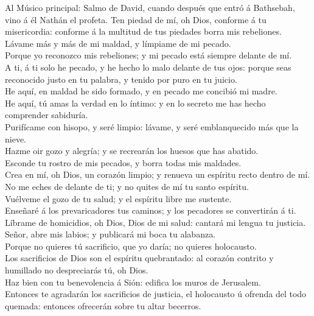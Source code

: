  Al Músico principal: Salmo de David, cuando después que
entró á Bathsebah, vino á él Nathán el profeta. Ten piedad de mí, oh
Dios, conforme á tu misericordia: conforme á la multitud de tus piedades
borra mis rebeliones.\\
 Lávame más y más de mi maldad, y límpiame de mi pecado.\\
 Porque yo reconozco mis rebeliones; y mi pecado está
siempre delante de mí.\\
 A ti, á ti solo he pecado, y he hecho lo malo delante de
tus ojos: porque seas reconocido justo en tu palabra, y tenido por puro
en tu juicio.\\
 He aquí, en maldad he sido formado, y en pecado me
concibió mi madre.\\
 He aquí, tú amas la verdad en lo íntimo: y en lo secreto
me has hecho comprender sabiduría.\\
 Purifícame con hisopo, y seré limpio: lávame, y seré
emblanquecido más que la nieve.\\
 Hazme oir gozo y alegría; y se recrearán los huesos que
has abatido.\\
 Esconde tu rostro de mis pecados, y borra todas mis
maldades.\\
 Crea en mí, oh Dios, un corazón limpio; y renueva un
espíritu recto dentro de mí.\\
 No me eches de delante de ti; y no quites de mí tu santo
espíritu.\\
 Vuélveme el gozo de tu salud; y el espíritu libre me
sustente.\\
 Enseñaré á los prevaricadores tus caminos; y los
pecadores se convertirán á ti.\\
 Líbrame de homicidios, oh Dios, Dios de mi salud:
cantará mi lengua tu justicia.\\
 Señor, abre mis labios; y publicará mi boca tu
alabanza.\\
 Porque no quieres tú sacrificio, que yo daría; no
quieres holocausto.\\
 Los sacrificios de Dios son el espíritu quebrantado: al
corazón contrito y humillado no despreciarás tú, oh Dios.\\
 Haz bien con tu benevolencia á Sión: edifica los muros
de Jerusalem.\\
 Entonces te agradarán los sacrificios de justicia, el
holocausto ú ofrenda del todo quemada: entonces ofrecerán sobre tu altar
becerros.

